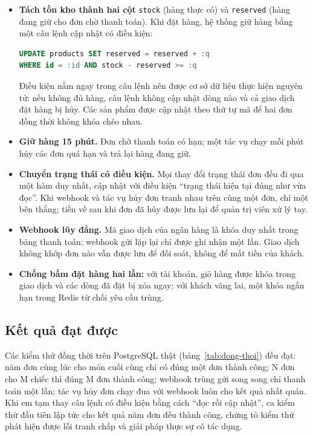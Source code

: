 \begin{itemize}
  \item \textbf{Tách tồn kho thành hai cột} \texttt{stock} (hàng thực có) và \texttt{reserved} (hàng đang giữ cho đơn chờ thanh toán). Khi đặt hàng, hệ thống giữ hàng bằng một câu lệnh cập nhật có điều kiện:
\begin{lstlisting}[language=SQL]
UPDATE products SET reserved = reserved + :q
WHERE id = :id AND stock - reserved >= :q
\end{lstlisting}
  Điều kiện nằm ngay trong câu lệnh nên được cơ sở dữ liệu thực hiện nguyên tử: nếu không đủ hàng, câu lệnh không cập nhật dòng nào và cả giao dịch đặt hàng bị hủy. Các sản phẩm được cập nhật theo thứ tự mã để hai đơn đồng thời không khóa chéo nhau.
  \item \textbf{Giữ hàng 15 phút.} Đơn chờ thanh toán có hạn; một tác vụ chạy mỗi phút hủy các đơn quá hạn và trả lại hàng đang giữ.
  \item \textbf{Chuyển trạng thái có điều kiện.} Mọi thay đổi trạng thái đơn đều đi qua một hàm duy nhất, cập nhật với điều kiện ``trạng thái hiện tại đúng như vừa đọc''. Khi webhook và tác vụ hủy đơn tranh nhau trên cùng một đơn, chỉ một bên thắng; tiền về sau khi đơn đã hủy được lưu lại để quản trị viên xử lý tay.
  \item \textbf{Webhook lũy đẳng.} Mã giao dịch của ngân hàng là khóa duy nhất trong bảng thanh toán; webhook gửi lặp lại chỉ được ghi nhận một lần. Giao dịch không khớp đơn nào vẫn được lưu để đối soát, không để mất tiền của khách.
  \item \textbf{Chống bấm đặt hàng hai lần:} với tài khoản, giỏ hàng được khóa trong giao dịch và các dòng đã đặt bị xóa ngay; với khách vãng lai, một khóa ngắn hạn trong Redis từ chối yêu cầu trùng.
\end{itemize}

\subsection{Kết quả đạt được}

Các kiểm thử đồng thời trên PostgreSQL thật (bảng~\ref{tab:dong-thoi}) đều đạt: năm đơn cùng lúc cho món cuối cùng chỉ có đúng một đơn thành công; N đơn cho M chiếc thì đúng M đơn thành công; webhook trùng gửi song song chỉ thanh toán một lần; tác vụ hủy đơn chạy đua với webhook luôn cho kết quả nhất quán. Khi em tạm thay câu lệnh có điều kiện bằng cách ``đọc rồi cập nhật'', ca kiểm thử đầu tiên lập tức cho kết quả năm đơn đều thành công, chứng tỏ kiểm thử phát hiện được lỗi tranh chấp và giải pháp thực sự có tác dụng.

